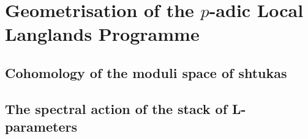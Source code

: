\chapter{Geometrisation of the \texorpdfstring{$p$}{}-adic Local Langlands Programme}
    \begin{abstract}
        
    \end{abstract}
    
    \minitoc
    
    \section{Cohomology of the moduli space of shtukas}
    
    \section{The spectral action of the stack of L-parameters}